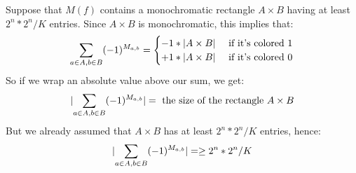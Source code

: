 Suppose that $M(f)$ contains a monochromatic rectangle $A \times B$ having at least $2^n * 2^n / K$ entries.
\pause
Since $A \times B$ is monochromatic, this implies that:
\[\sum_{a \in A, b \in B} (-1)^{M_{a,b}} = \begin{cases}
-1 * \lvert A \times B\rvert & \text{ if it's colored } 1 \\
+1 * \lvert A \times B\rvert & \text{ if it's colored } 0\end{cases}\]
\pause
So if we wrap an absolute value above our sum, we get:
\[\lvert\sum_{a \in A, b \in B} (-1)^{M_{a,b}}\rvert = \text{ the size of the rectangle } A \times B\]
\pause
But we already assumed that $A \times B$ has at least $2^n * 2^n / K$ entries, hence:
\[\lvert\sum_{a \in A, b \in B} (-1)^{M_{a,b}}\rvert = \geq 2^n * 2^n / K\]